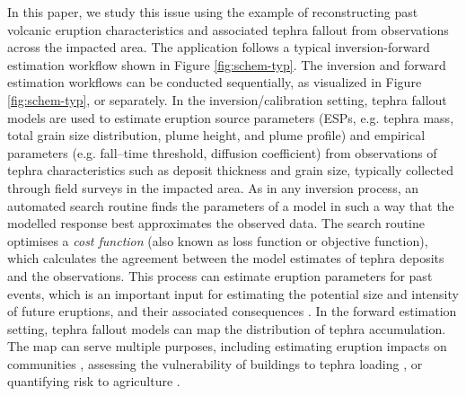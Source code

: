 \documentclass[a4paper,fleqn]{cas-sc}
\begin{document}
In this paper, we study this issue using the example of reconstructing past volcanic eruption characteristics and associated tephra fallout from observations across the impacted area. The application follows a typical inversion-forward estimation workflow shown in Figure \ref{fig:schem-typ}. The inversion and forward estimation workflows can be conducted sequentially, as visualized in Figure \ref{fig:schem-typ}, or separately. In the inversion/calibration setting, tephra fallout models are used to estimate eruption source parameters (ESPs, e.g. tephra mass, total grain size distribution, plume height, and plume profile) and empirical parameters (e.g. fall–time threshold, diffusion coefficient) from observations of tephra characteristics such as deposit thickness and grain size, typically collected through field surveys in the impacted area. As in any inversion process, an automated search routine finds the parameters of a model in such a way that the modelled response best approximates the observed data. The search routine optimises a \textit{cost function} (also known as loss function or objective function), which calculates the agreement between the model estimates of tephra deposits and the observations. This process can estimate eruption parameters for past events, which is an important input for estimating the potential size and intensity of future eruptions, and their associated consequences \citep{newhall1982volcanic, carey1986quantitative, pieri1986eruption, armienti1988numerical, scarpati1993neapolitan, mastin2009multidisciplinary, stohl2011determination, pouget2013estimation, madankan2014computation, bear2020automated}. In the forward estimation setting, tephra fallout models can map the distribution of tephra accumulation. The map can serve multiple purposes, including estimating eruption impacts on communities \citep{le2012, wardman2012, magill2013, biass2017}, assessing the vulnerability of buildings to tephra loading \citep{williams2020, HAYES2019142, spence2005}, or quantifying risk to agriculture \citep{gomez2006, ayris2012, thompson2017}. 
\end{document}
